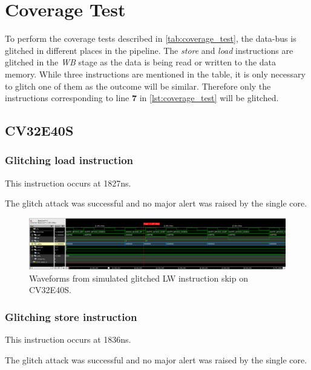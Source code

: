 \section{Coverage Test}
\label{sec:cov_test_result}

To perform the coverage tests described in \autoref{tab:coverage_test}, the data-bus is glitched in different places in the pipeline. The \textit{store} and \textit{load} instructions are glitched in the \textit{WB} stage as the data is being read or written to the data memory. While three instructions are mentioned in the table, it is only necessary to glitch one of them as the outcome will be similar. Therefore only the instructions corresponding to line \textbf{7} in \autoref{lst:coverage_test} will be glitched. 

\subsection{CV32E40S}

\subsubsection{Glitching load instruction}

This instruction occurs at 1827ns. 

The glitch attack was successful and no major alert was raised by the single core. 

\begin{figure}[h!]
    \centering
    \includegraphics[width=\textwidth]{docs/images/lw_glitch_single_core.png}
    \caption{Waveforms from simulated glitched LW instruction skip on CV32E40S.}
    \label{fig:lw_glitch_single_wave}
\end{figure}

\subsubsection{Glitching store instruction}

This instruction occurs at 1836ns. 

The glitch attack was successful and no major alert was raised by the single core. 

